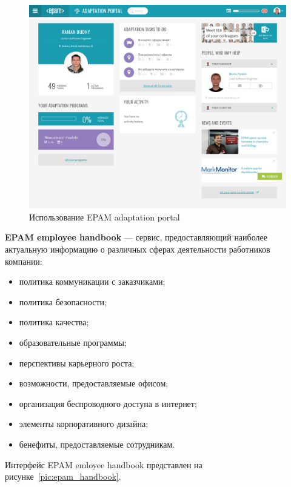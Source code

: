 \begin{figure}[h!]
  \centering
  \includegraphics[width=150mm]{pic/epam_adaptation.png}
  \caption{Использование EPAM adaptation portal}
  \label{pic:epam_adaptation}
\end{figure}

\newpage

\textbf{EPAM employee handbook} --- сервис, предоставляющий наиболее актуальную
информацию о различных сферах деятельности работников компании:
\begin{itemize}
\item политика коммуникации с заказчиками;
\item политика безопасности;
\item политика качества;
\item образовательные программы;
\item перспективы карьерного роста;
\item возможности, предоставляемые офисом;
\item организация беспроводного доступа в интернет;
\item элементы корпоративного дизайна;
\item бенефиты, предоставляемые сотрудникам.
\end{itemize}


Интерфейс EPAM emloyee handbook представлен на рисунке~\ref{pic:epam_handbook}.

